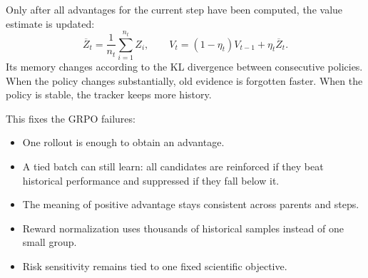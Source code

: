 Only after all advantages for the current step have been computed, the value
estimate is updated:
\[
\overline{Z}_t=\frac{1}{n_t}\sum_{i=1}^{n_t}Z_i,
\qquad
V_t=(1-\eta_t)V_{t-1}+\eta_t\overline{Z}_t.
\]
Its memory changes according to the KL divergence between consecutive policies.
When the policy changes substantially, old evidence is forgotten faster. When
the policy is stable, the tracker keeps more history.

This fixes the GRPO failures:
\begin{itemize}
    \item One rollout is enough to obtain an advantage.
    \item A tied batch can still learn: all candidates are reinforced if they
    beat historical performance and suppressed if they fall below it.
    \item The meaning of positive advantage stays consistent across parents
    and steps.
    \item Reward normalization uses thousands of historical samples instead
    of one small group.
    \item Risk sensitivity remains tied to one fixed scientific objective.
\end{itemize}







